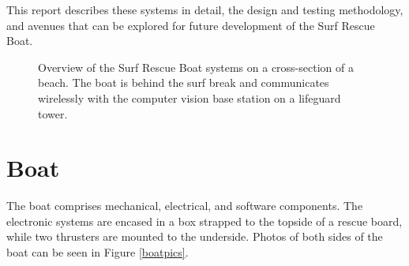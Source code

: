 \documentclass[a4paper]{IEEEtran}
\begin{document}
This report describes these systems in detail, the design and testing methodology, and avenues that can be explored for future development of the Surf Rescue Boat.

\begin{figure}[h]
\center
{}
\caption{Overview of the Surf Rescue Boat systems on a cross-section of a beach. The boat is behind the surf break and communicates wirelessly with the computer vision base station on a lifeguard tower.}
\label{sysoverview}
\end{figure}

\section{Boat}

The boat comprises mechanical, electrical, and software components. The electronic systems are encased in a box strapped to the topside of a rescue board, while two thrusters are mounted to the underside. Photos of both sides of the boat can be seen in Figure \ref{boatpics}.
\end{document}

